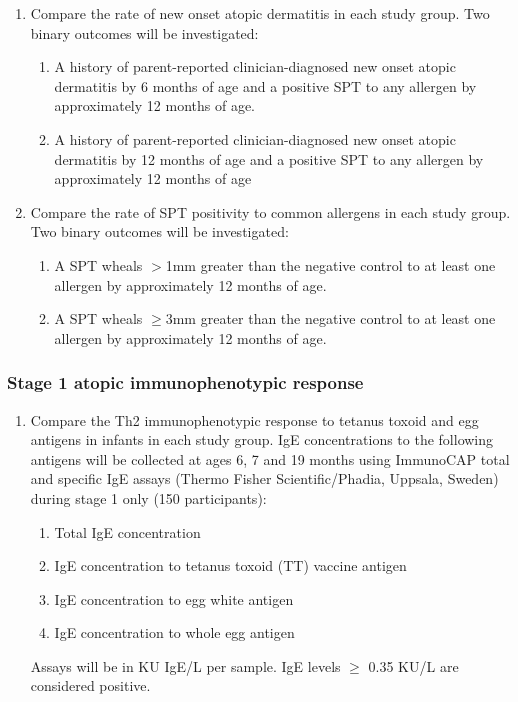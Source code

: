 \documentclass{bmcart}
\begin{document}
\begin{enumerate}
	\item Compare the rate of new onset atopic dermatitis in each study group. 
	Two binary outcomes will be investigated:
	\begin{enumerate}
		\item A history of parent-reported clinician-diagnosed new onset atopic dermatitis by 6 months of age and a positive SPT to any allergen by approximately 12 months of age.
		\item A history of parent-reported clinician-diagnosed new onset atopic dermatitis by 12 months of age and a positive SPT to any allergen by approximately 12 months of age
	\end{enumerate}
	\item Compare the rate of SPT positivity to common allergens in each study group.
	Two binary outcomes will be investigated:
	\begin{enumerate}
		\item A SPT wheals $>$1mm greater than the negative control to at least one allergen by approximately 12 months of age.
		\item A SPT wheals $\geq$3mm greater than the negative control to at least one allergen by approximately 12 months of age.
	\end{enumerate}
\end{enumerate}

\subsubsection*{Stage 1 atopic immunophenotypic response}

\begin{enumerate}[resume]
	\item Compare the Th2 immunophenotypic response to tetanus toxoid and egg antigens in infants in each study group.
	IgE concentrations to the following antigens will be collected at ages 6, 7 and 19 months using ImmunoCAP total and specific IgE assays (Thermo Fisher Scientific/Phadia, Uppsala, Sweden) during stage 1 only (150 participants):
	\begin{enumerate}
		\item Total IgE concentration
		\item IgE concentration to tetanus toxoid (TT) vaccine antigen
		\item IgE concentration to egg white antigen
		\item IgE concentration to whole egg antigen
	\end{enumerate}
	Assays will be in KU IgE/L per sample.
	IgE levels $\geq$ 0.35 KU/L are considered positive.
\end{enumerate}
\end{document}
